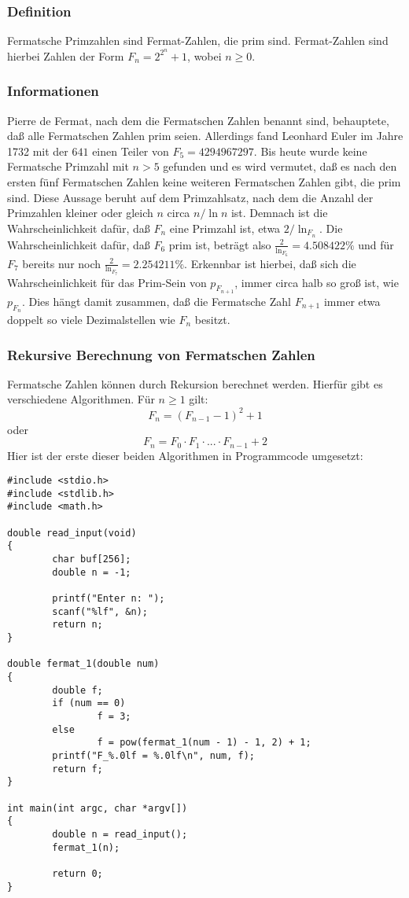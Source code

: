 \subsubsection{Definition}
Fermatsche Primzahlen sind Fermat-Zahlen, die prim sind. Fermat-Zahlen sind hierbei Zahlen der Form $F_n = 2^{2^n} + 1$, wobei $n \ge 0$.
\subsubsection{Informationen}
Pierre de Fermat, nach dem die Fermatschen Zahlen benannt sind, behauptete, daß alle Fermatschen Zahlen prim seien. Allerdings fand Leonhard Euler im Jahre 1732 mit der $641$ einen Teiler von $F_5=4294967297$. Bis heute wurde keine Fermatsche Primzahl mit $n > 5$ gefunden und es wird vermutet, daß es nach den ersten fünf Fermatschen Zahlen keine weiteren Fermatschen Zahlen gibt, die prim sind. Diese Aussage beruht auf dem Primzahlsatz, nach dem die Anzahl der Primzahlen kleiner oder gleich $n$ circa $n / \ln n$ ist. Demnach ist die Wahrscheinlichkeit dafür, daß $F_n$ eine Primzahl ist, etwa $2 / \ln_{F_n}$. Die Wahrscheinlichkeit dafür, daß $F_6$ prim ist, beträgt also $\frac{2}{\ln_{F_6}} = 4.508422\%$ und für $F_7$ bereits nur noch $\frac{2}{\ln_{F_7}} = 2.254211\%$. Erkennbar ist hierbei, daß sich die Wahrscheinlichkeit für das Prim-Sein von $p_{F_{n+1}}$, immer circa halb so groß ist, wie $p_{F_{n}}$. Dies hängt damit zusammen, daß die Fermatsche Zahl $F_{n+1}$ immer etwa doppelt so viele Dezimalstellen wie $F_{n}$ besitzt.
\subsubsection{Rekursive Berechnung von Fermatschen Zahlen}
Fermatsche Zahlen können durch Rekursion berechnet werden. Hierfür gibt es verschiedene Algorithmen.
Für $n \ge 1$ gilt:
\begin{equation}
F_n = (F_{n - 1} - 1 )^2 + 1
\end{equation}
oder
\begin{equation}
F_n = F_0 \cdot F_1 \cdot ... \cdot F_{n-1} + 2
\end{equation}
Hier ist der erste dieser beiden Algorithmen in Programmcode umgesetzt:
\lstset{language=C}
\begin{lstlisting}[frame=single]
#include <stdio.h>
#include <stdlib.h>
#include <math.h>

double read_input(void)
{
        char buf[256];
        double n = -1;

        printf("Enter n: ");
        scanf("%lf", &n);
        return n;
}

double fermat_1(double num)
{
        double f;
        if (num == 0)
                f = 3;
        else
                f = pow(fermat_1(num - 1) - 1, 2) + 1;
        printf("F_%.0lf = %.0lf\n", num, f);
        return f;
}

int main(int argc, char *argv[])
{
        double n = read_input();
        fermat_1(n);

        return 0;
}
\end{lstlisting}

